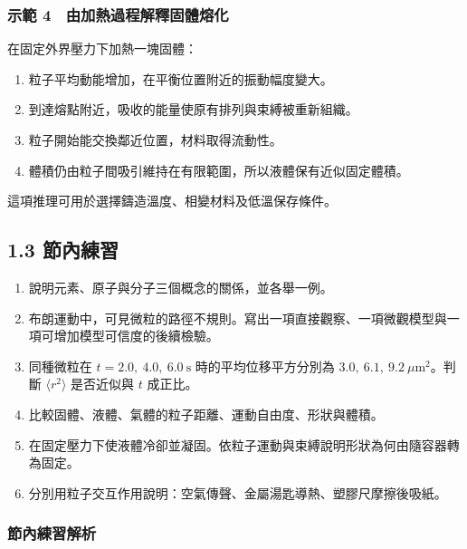 \documentclass[11pt,a4paper]{article}
\providecommand{\tightlist}{%
  \setlength{\itemsep}{0pt}\setlength{\parskip}{0pt}}
\begin{document}
\subsubsection{示範 4　由加熱過程解釋固體熔化}\label{ux793aux7bc4-4-ux7531ux52a0ux71b1ux904eux7a0bux89e3ux91cbux56faux9ad4ux7194ux5316}

在固定外界壓力下加熱一塊固體：

\begin{enumerate}
\def\labelenumi{\arabic{enumi}.}
\tightlist
\item
  粒子平均動能增加，在平衡位置附近的振動幅度變大。
\item
  到達熔點附近，吸收的能量使原有排列與束縛被重新組織。
\item
  粒子開始能交換鄰近位置，材料取得流動性。
\item
  體積仍由粒子間吸引維持在有限範圍，所以液體保有近似固定體積。
\end{enumerate}

這項推理可用於選擇鑄造溫度、相變材料及低溫保存條件。

\subsection{1.3 節內練習}\label{ux7bc0ux5167ux7df4ux7fd2}

\begin{enumerate}
\def\labelenumi{\arabic{enumi}.}
\tightlist
\item
  說明元素、原子與分子三個概念的關係，並各舉一例。
\item
  布朗運動中，可見微粒的路徑不規則。寫出一項直接觀察、一項微觀模型與一項可增加模型可信度的後續檢驗。
\item
  同種微粒在 \(t=2.0,\ 4.0,\ 6.0\ \mathrm s\) 時的平均位移平方分別為 \(3.0,\ 6.1,\ 9.2\ \mu\mathrm m^2\)。判斷 \(\langle r^2\rangle\) 是否近似與 \(t\) 成正比。
\item
  比較固體、液體、氣體的粒子距離、運動自由度、形狀與體積。
\item
  在固定壓力下使液體冷卻並凝固。依粒子運動與束縛說明形狀為何由隨容器轉為固定。
\item
  分別用粒子交互作用說明：空氣傳聲、金屬湯匙導熱、塑膠尺摩擦後吸紙。
\end{enumerate}

\subsubsection{節內練習解析}\label{ux7bc0ux5167ux7df4ux7fd2ux89e3ux6790}
\end{document}
